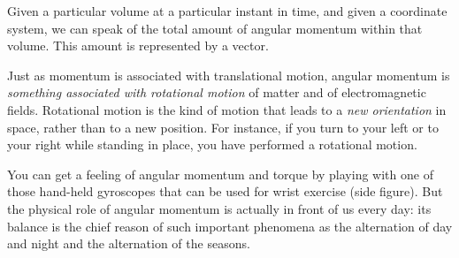 \documentclass[a4paper,12pt,%
onecolumn,oneside,%
british%
]{memoir}
\renewcommand*{\|}[1][]{\nonscript\:#1\vert\nonscript\:\mathopen{}}
\newcommand*{\sect}{\S}%
\begin{document}
Given a particular volume at a particular instant in time, and given a coordinate system, we can speak of the total amount of angular momentum within that volume. This amount is represented by a vector.


\medskip

Just as momentum is associated with translational motion, angular momentum is \emph{something associated with rotational motion} of matter and of electromagnetic fields. Rotational motion is the kind of motion that leads to a \emph{new orientation} in space, rather than to a new position. For instance, if you turn to your left or to your right while standing in place, you have performed a rotational motion.

You can get a feeling of angular momentum and torque by playing with one of those hand-held gyroscopes that can be used for wrist exercise (side figure). But the physical role of angular momentum is actually in front of us every day: its balance is the chief reason of such important phenomena as the alternation of day and night and the alternation of the seasons.
%
%
\end{document}
